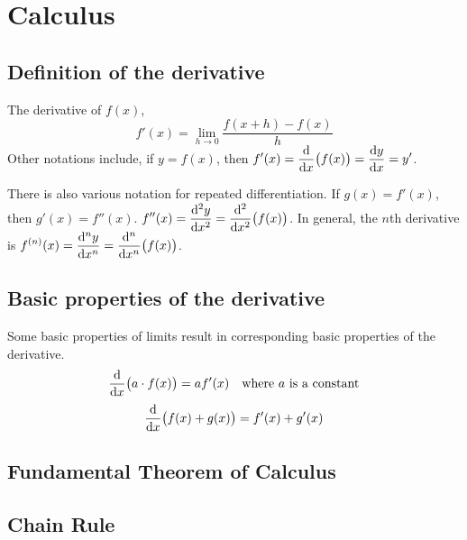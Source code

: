 \documentclass[fleqn,a4paper,11pt]{article}
\begin{document}

    \section{Calculus}


    \subsection{Definition of the derivative}

    The derivative of \(f(x)\),
    \begin{equation}
    f'(x) = \lim_{h \to 0} \frac{f(x + h) - f(x)}{h}
    \end{equation}
    Other notations include, if \(y = f(x)\), then
    \(\displaystyle f'(x) = \dv{x}(f(x)) = \dv{y}{x} = y'\).

    There is also various notation for repeated differentiation. If
    \(g(x) = f'(x)\), then \(g'(x) = f''(x)\).
    \(\displaystyle f''(x) = \dv[2]{y}{x} = \dv[2]{x}(f(x))\). In general, the
    \(n\)th derivative is
    \(\displaystyle f^{(n)}(x) = \dv[n]{y}{x} = \dv[n]{x}(f(x))\).

    \subsection{Basic properties of the derivative}
    \label{sec_calc_derivative_properties}

    Some basic properties of limits result in corresponding basic properties of
    the derivative.
    \begin{equation*}
    \dv{x}(a \cdot f(x)) = af'(x) \quad \text{where \(a\) is a constant}
    \end{equation*}
    \begin{equation*}
    \dv{x}(f(x) + g(x)) = f'(x) + g'(x)
    \end{equation*}

    \subsection{Fundamental Theorem of Calculus} \label{sec_calc_FTC}

    \subsection{Chain Rule} \label{sec_calc_chain}
\end{document}
